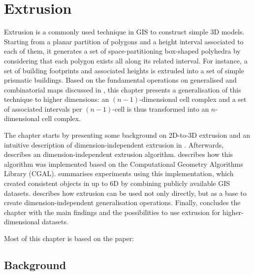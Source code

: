 
\chapter{Extrusion}
\label{ch:extrusion}

Extrusion is a commonly used technique in GIS to construct simple 3D models.
Starting from a planar partition of polygons and a height interval associated to each of them, it generates a set of space-partitioning box-shaped polyhedra by considering that each polygon exists all along its related interval.
For instance, a set of building footprints and associated heights is extruded into a set of simple prismatic buildings.
Based on the fundamental operations on generalised and combinatorial maps discussed in , this chapter presents a generalisation of this technique to higher dimensions: an $(n-1)$-dimensional cell complex and a set of associated intervals per $(n-1)$-cell is thus transformed into an $n$-dimensional cell complex.

The chapter starts by presenting some background on 2D-to-3D extrusion and an intuitive description of dimension-independent extrusion in .
Afterwards,  describes an dimension-independent extrusion algorithm.
 describes how this algorithm was implemented based on the Computational Geometry Algorithms Library (CGAL).
 summarises experiments using this implementation, which created consistent objects in up to 6D by combining publicly available GIS datasets.
 describes how extrusion can be used not only directly, but as a base to create dimension-independent generalisation operations.
Finally,  concludes the chapter with the main findings and the possibilities to use extrusion for higher-dimensional datasets.

Most of this chapter is based on the paper:
\begin{itemize}
\paperijgisextrusion%
\end{itemize}

\section{Background}
\label{se:extrusion-background}

